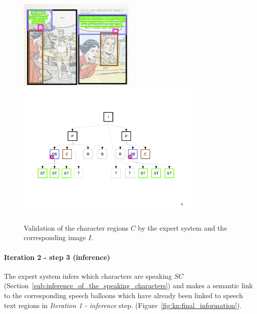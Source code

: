  \begin{figure}[!ht]  %
   \centering
   \includegraphics[trim= 0px 0px 0px 0px, clip, width=0.5\textwidth]{process_illustration_valid_2.png}\\
  \includegraphics[trim= 0px 128px 20px 85px, clip, width=0.8\textwidth]{graph_valid_2.pdf}
  \caption[Validation of the character regions $C$ by the expert system]{Validation of the character regions $C$ by the expert system and the corresponding image $I$.
  }
  \label{fig:kn:valid_2}
 \end{figure}

\paragraph{Iteration 2 - step 3 (inference)} %
\label{par:step_6}
The expert system infers which characters are speaking $SC$ (Section~\ref{sub:inference_of_the_speaking_characters}) and makes a semantic link to the corresponding speech balloons which have already been linked to speech text regions in {\it Iteration 1 - inference} step. (Figure~\ref{fig:kn:final_information}).


